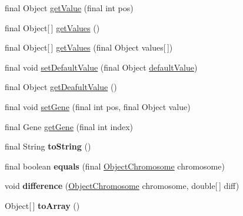 \begin{DoxyCompactItemize}
\item 
final Object \hyperlink{classjenes_1_1chromosome_1_1_object_chromosome_af221c16bbcd9f03867d2e4295216cc93}{get\-Value} (final int pos)
\item 
final Object\mbox{[}$\,$\mbox{]} \hyperlink{classjenes_1_1chromosome_1_1_object_chromosome_af41d722cff36fbb837c0038c885de04c}{get\-Values} ()
\item 
final Object\mbox{[}$\,$\mbox{]} \hyperlink{classjenes_1_1chromosome_1_1_object_chromosome_a7476459dce852e9a7fce5d35276817e8}{get\-Values} (final Object values\mbox{[}$\,$\mbox{]})
\item 
final void \hyperlink{classjenes_1_1chromosome_1_1_object_chromosome_a44d425a777314b8e9de58b680e686454}{set\-Default\-Value} (final Object \hyperlink{classjenes_1_1chromosome_1_1_object_chromosome_af5e2ac0b5272d948ec566f824baa3411}{default\-Value})
\item 
final Object \hyperlink{classjenes_1_1chromosome_1_1_object_chromosome_aea3da542f5b0d9c3300dc76cec3385f9}{get\-Deafult\-Value} ()
\item 
final void \hyperlink{classjenes_1_1chromosome_1_1_object_chromosome_ae68b9a0568dfc16f4f543438e54ac0ea}{set\-Gene} (final int pos, final Object value)
\item 
final Gene \hyperlink{classjenes_1_1chromosome_1_1_object_chromosome_abadaf50e19a5fd0ac5279de47914af99}{get\-Gene} (final int index)
\item 
\hypertarget{classjenes_1_1chromosome_1_1_object_chromosome_a660652ffc502cace60aceb16a5854de3}{final String {\bfseries to\-String} ()}\label{classjenes_1_1chromosome_1_1_object_chromosome_a660652ffc502cace60aceb16a5854de3}

\item 
\hypertarget{classjenes_1_1chromosome_1_1_object_chromosome_abeb710a44460d3699bf991590c41574a}{final boolean {\bfseries equals} (final \hyperlink{classjenes_1_1chromosome_1_1_object_chromosome}{Object\-Chromosome} chromosome)}\label{classjenes_1_1chromosome_1_1_object_chromosome_abeb710a44460d3699bf991590c41574a}

\item 
\hypertarget{classjenes_1_1chromosome_1_1_object_chromosome_a8afa1cbf1df7b9d65a9a8c34f476aa67}{void {\bfseries difference} (\hyperlink{classjenes_1_1chromosome_1_1_object_chromosome}{Object\-Chromosome} chromosome, double\mbox{[}$\,$\mbox{]} diff)}\label{classjenes_1_1chromosome_1_1_object_chromosome_a8afa1cbf1df7b9d65a9a8c34f476aa67}

\item 
\hypertarget{classjenes_1_1chromosome_1_1_object_chromosome_add9ff43a69d5991043baa4423877f255}{Object\mbox{[}$\,$\mbox{]} {\bfseries to\-Array} ()}\label{classjenes_1_1chromosome_1_1_object_chromosome_add9ff43a69d5991043baa4423877f255}

\end{DoxyCompactItemize}
